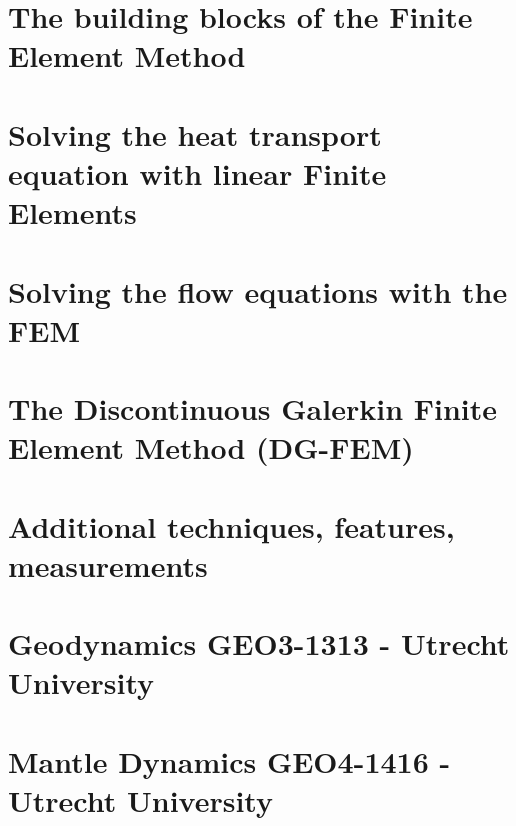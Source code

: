\documentclass[a4paper]{article}
\numberwithin{equation}{section}
\begin{document}
\section{The building blocks of the Finite Element Method} %


\newpage 
\section{Solving the heat transport equation with linear Finite Elements} %


\newpage 
\section{Solving the flow equations with the FEM} \label{solvingFEM} %


\newpage
\section{The Discontinuous Galerkin Finite Element Method (DG-FEM) \label{dgfem}} %


\newpage
\section{Additional techniques, features, measurements} %


\newpage
\section{Geodynamics GEO3-1313 - Utrecht University} %


\newpage
\section{Mantle Dynamics GEO4-1416 - Utrecht University} %

\end{document}
